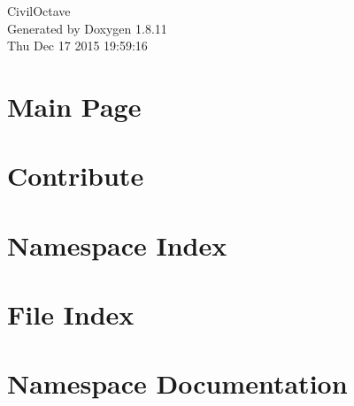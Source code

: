 \documentclass[twoside]{book}
\newcommand{\+}{\discretionary{\mbox{\scriptsize$\hookleftarrow$}}{}{}}
\newcommand{\clearemptydoublepage}{%
  \newpage{\pagestyle{empty}\cleardoublepage}%
}
\begin{document}
\hypersetup{pageanchor=false,
             bookmarks=true,
             bookmarksnumbered=true,
             pdfencoding=unicode
            }
\begin{titlepage}
\vspace*{7cm}
\begin{center}%
{\Large Civil\+Octave }\\
\vspace*{1cm}
{\large Generated by Doxygen 1.8.11}\\
\vspace*{0.5cm}
{\small Thu Dec 17 2015 19:59:16}\\
\end{center}
\end{titlepage}
\clearemptydoublepage
\tableofcontents
\clearemptydoublepage
{}
\hypersetup{pageanchor=true}

\chapter{Main Page}
\label{index}\hypertarget{index}{}
\chapter{Contribute}
\label{md__home_amarjeet_projects_CivilOctave_sage_Contribute}
\hypertarget{md__home_amarjeet_projects_CivilOctave_sage_Contribute}{}

\chapter{Namespace Index}

\chapter{File Index}

\chapter{Namespace Documentation}












\end{document}
